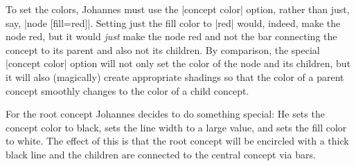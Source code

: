 To set the colors, Johannes must use the |concept color| option,
rather than just, say, |node [fill=red]|. Setting just the fill color
to |red| would, indeed, make the node red, but it would \emph{just}
make the node red and not the bar connecting the concept to its parent
and also not its children. By comparison, the special |concept color|
option will not only set the color of the node and its children, but
it will also (magically) create appropriate shadings so that the color
of a parent concept smoothly changes to the color of a child concept.

For the root concept Johannes decides to do something special: He sets
the concept color to black, sets the line width to a large value, and
sets the fill color to white. The effect of this is that the root
concept will be encircled with a thick black line and the children are
connected to the central concept via bars.


